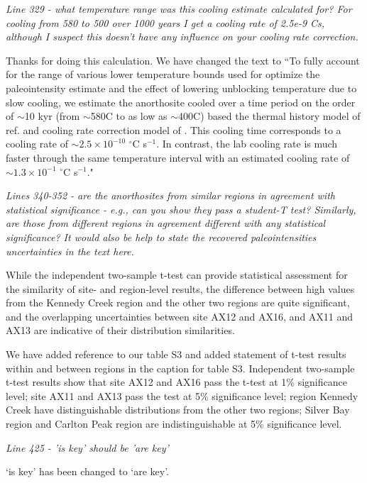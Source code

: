 \documentclass[11pt, letterpaper]{article}
\begin{document}
\begin{flushleft}
\textit{Line 329 - what temperature range was this cooling estimate calculated for? For cooling from 580 to 500 over 1000 years I get a cooling rate of 2.5e-9 C\/s, although I suspect this doesn't have any influence on your cooling rate correction.}

Thanks for doing this calculation. We have changed the text to ``To fully account for the range of various lower temperature bounds used for optimize the paleointensity estimate and the effect of lowering unblocking temperature due to slow cooling, we estimate the anorthosite cooled over a time period on the order of $\sim$10 kyr (from $\sim$580\textdegree C to as low as $\sim$400\textdegree C) based the thermal history model of ref. \citealp{Zhang2021b} and cooling rate correction model of \cite{Pullaiah1975a}. This cooling time corresponds to a cooling rate of $\sim2.5\times10^{-10}$ $^\circ$C s$^{-1}$. In contrast, the lab cooling rate is much faster through the same temperature interval with an estimated cooling rate of $\sim1.3\times10^{-1}$ $^\circ$C s$^{-1}$."

\textit{Lines 340-352 - are the anorthosites from similar regions in agreement with statistical significance - e.g., can you show they pass a student-T test? Similarly, are those from different regions in agreement\/ different with any statistical significance? It would also be help to state the recovered paleointensities\/ uncertainties in the text here.}

While the independent two-sample t-test can provide statistical assessment for the similarity of site- and region-level results, the difference between high values from the Kennedy Creek region and the other two regions are quite significant, and the overlapping uncertainties between site AX12 and AX16, and AX11 and AX13 are indicative of their distribution similarities. 

We have added reference to our table S3 and added statement of t-test results within and between regions in the caption for table S3. Independent two-sample t-test results show that site AX12 and AX16 pass the t-test at 1\% significance level; site AX11 and AX13 pass the test at 5\% significance level; region Kennedy Creek have distinguishable distributions from the other two regions; Silver Bay region and Carlton Peak region are indistinguishable at 5\% significance level.

\textit{Line 425 - 'is key' should be 'are key'}

`is key' has been changed to `are key'. 


\end{flushleft}
\end{document}
